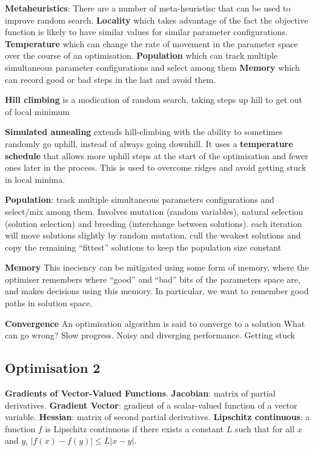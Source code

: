 \documentclass{article}
\begin{document}
\textbf{Metaheuristics}:
There are a number of meta-heuristisc that can be used to improve random search.
\textbf{Locality} which takes advantage of the fact the objective function is likely to have similar values for similar parameter configurations.
\textbf{Temperature} which can change the rate of movement in the parameter space over the course of an optimisation.
\textbf{Population} which can track multiple simultaneous parameter configurations and select among them
\textbf{Memory} which can record good or bad steps in the last and avoid them.

\textbf{Hill climbing} is a modication of random search, taking steps up hill to get out of local minimum

\textbf{Simulated annealing} extends hill-climbing with the ability to sometimes randomly go
uphill, instead of always going downhill. It uses a \textbf{temperature schedule} that allows more
uphill steps at the start of the optimisation and fewer ones later in the process. This is used
to overcome ridges and avoid getting stuck in local minima.

\textbf{Population}: track multiple simultaneous parameters configurations and select/mix among them.
Involves mutation (random variables), natural selection (solution selection) and breeding (interchange between solutions).
each iteration will move solutions slightly by random mutation, cull the weakest solutions and copy the remaining “fittest” solutions to keep the population size constant

\textbf{Memory} This ineciency can be mitigated
using some form of memory, where the optimiser remembers where “good” and “bad” bits
of the parameters space are, and makes decisions using this memory. In particular, we want
to remember good paths in solution space.

\textbf{Convergence}
An optimisation algorithm is said to converge to a solution
What can go wrong? Slow progress. Noisy and diverging performance. Getting stuck



\subsection*{Optimisation 2}

\textbf{Gradients of Vector-Valued Functions}.
\textbf{Jacobian}: matrix of partial derivatives.
\textbf{Gradient Vector}: gradient of a scalar-valued function of a vector variable.
\textbf{Hessian}: matrix of second partial derivatives.
\textbf{Lipschitz continuous}: a function $f$ is Lipschitz continuous if there exists a constant $L$ such that for all $x$ and $y$, $|f(x) - f(y)| \leq L |x - y|$.
\end{document}
